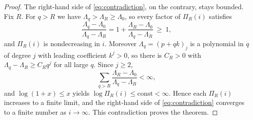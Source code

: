 \documentclass[10pt,a4paper]{amsart}
\newcommand{\fall}[2]{(#1)_{#2}}
\begin{document}
\begin{proof}
The right-hand side of \eqref{eq:contradiction}, on the contrary, stays
bounded.  Fix \(R\).  For \(q>R\) we have \(\Lambda_q>\Lambda_R\ge\Lambda_0\),
so every factor of \(\Pi_R(i)\) satisfies
\[
\frac{\Lambda_q-\Lambda_0}{\Lambda_q-\Lambda_R}
=1+\frac{\Lambda_R-\Lambda_0}{\Lambda_q-\Lambda_R}\ \ge\ 1,
\]
and \(\Pi_R(i)\) is nondecreasing in \(i\).  Moreover
\(\Lambda_q=\fall{p+qk}{j}\) is a polynomial in \(q\) of degree \(j\) with
leading coefficient \(k^j>0\), so there is \(C_R>0\) with
\(\Lambda_q-\Lambda_R\ge C_R q^{j}\) for all large \(q\).  Since \(j\ge2\),
\[
\sum_{q>R}\frac{\Lambda_R-\Lambda_0}{\Lambda_q-\Lambda_R}<\infty,
\]
and \(\log(1+x)\le x\) yields
\(\log\Pi_R(i)\le\text{const}<\infty\).  Hence each \(\Pi_R(i)\) increases to
a finite limit, and the right-hand side of \eqref{eq:contradiction} converges
to a finite number as \(i\to\infty\).  This contradiction proves the theorem.
\end{proof}
\end{document}
